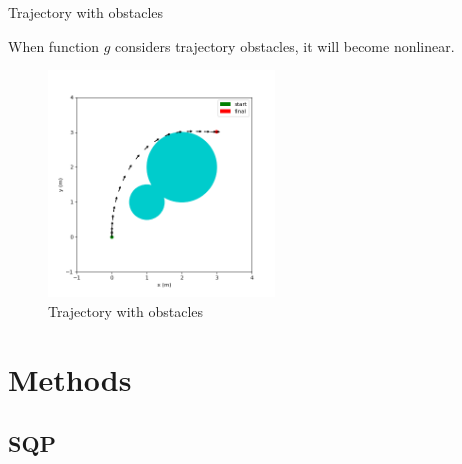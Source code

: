 \documentclass[10pt,compress]{beamer}
\begin{document}
\begin{frame}{Trajectory with obstacles}

When function $g$ considers trajectory obstacles, it will become nonlinear. 

\begin{figure}[t]
\includegraphics[width=6cm]{./images/with_obstacles.png}
\centering
\caption{Trajectory with obstacles }
\end{figure}

\end{frame}

\section{Methods}

\subsection{SQP}
\end{document}
